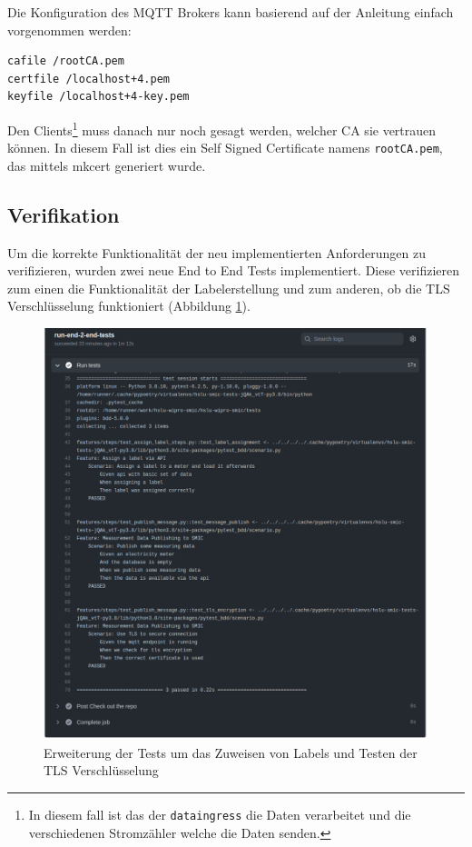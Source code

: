 Die Konfiguration des \ac{MQTT} Brokers kann basierend auf der Anleitung \parencite{mosquitto.conf_man_page_2021}
einfach vorgenommen werden:

\begin{verbatim}
cafile /rootCA.pem
certfile /localhost+4.pem
keyfile /localhost+4-key.pem
\end{verbatim}

Den Clients\footnote{
    In diesem fall ist das der \texttt{dataingress} die Daten verarbeitet und die verschiedenen
    Stromzähler welche die Daten senden.
} muss danach nur noch gesagt werden, welcher \ac{CA} sie vertrauen können.
In diesem Fall ist dies ein Self Signed Certificate namens \texttt{rootCA.pem}, das mittels
mkcert generiert wurde.

\subsection{Verifikation}

Um die korrekte Funktionalität der neu implementierten Anforderungen zu verifizieren, wurden
zwei neue End to End Tests implementiert. Diese verifizieren zum einen die Funktionalität der
Labelerstellung und zum anderen, ob die \ac{TLS} Verschlüsselung funktioniert (Abbildung \ref{fig:test-iteration-3}).

\begin{figure}[H]
    \centering
    \includegraphics[width=1.0\textwidth]{gfx/testlog-iteration-2}
    \caption{
        Erweiterung der Tests um das Zuweisen von Labels und Testen der \ac{TLS} Verschlüsselung \parencite{randombenj_testlog_it_2_2021}
    }
    \label{fig:test-iteration-3}
\end{figure}

